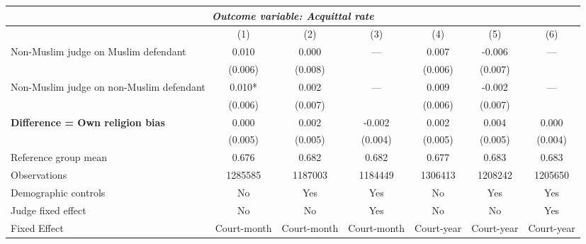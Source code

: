 {
\def\sym#1{\ifmmode^{#1}\else\(^{#1}\)\fi}
\begin{tabular}{l*{6}{c}}
  \hline\hline
\multicolumn{7}{c}{\textit{Outcome variable: Acquittal rate}}\\
\hline
&\multicolumn{1}{c}{(1)}&\multicolumn{1}{c}{(2)}&\multicolumn{1}{c}{(3)}&\multicolumn{1}{c}{(4)}&\multicolumn{1}{c}{(5)}&\multicolumn{1}{c}{(6)}\\
\hline
Non-Muslim judge on Muslim defendant \hspace{15mm}& 0.010 & 0.000 & --- & 0.007 & -0.006 & --- \\
& (0.006) & (0.008) &  & (0.006) &(0.007) &  \\
Non-Muslim judge on non-Muslim defendant \hspace{15mm}& 0.010* & 0.002 & ---& 0.009 & -0.002 & --- \\
& (0.006) & (0.007) &  & (0.006) & (0.007) &  \\
\textbf{Difference = Own religion bias} & 0.000 & 0.002 & -0.002 & 0.002 & 0.004 & 0.000 \\
& (0.005) & (0.005) & (0.004) & (0.005) & (0.005) & (0.004) \\
\hline
Reference group mean & 0.676 & 0.682 & 0.682 & 0.677 & 0.683 & 0.683 \\
Observations & 1285585 & 1187003 & 1184449 & 1306413 & 1208242 & 1205650 \\
Demographic controls & No & Yes & Yes & No & Yes & Yes \\
Judge fixed effect & No & No & Yes & No & No & Yes \\
Fixed Effect & Court-month & Court-month & Court-month & Court-year & Court-year & Court-year \\
\hline\hline
\end{tabular}
}
 
